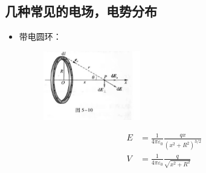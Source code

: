 \documentclass{ctexart}
\begin{document}
\subsection{几种常见的电场，电势分布}
\begin{itemize}
    \item 带电圆环：
    \begin{figure}[H]
        \centering
        \includegraphics[width=0.4\textwidth]{img/5-10.jpg}
    \end{figure}
    \begin{align*}
        E &= \frac{1}{4\pi \varepsilon_0} \frac{qx}{(x^2 + R^2)^{3/2}}\\
        V &= \frac{1}{4\pi \varepsilon_0} \frac{q}{\sqrt{x^2 + R^2}}
    \end{align*}
    

\end{itemize}
\end{document}
